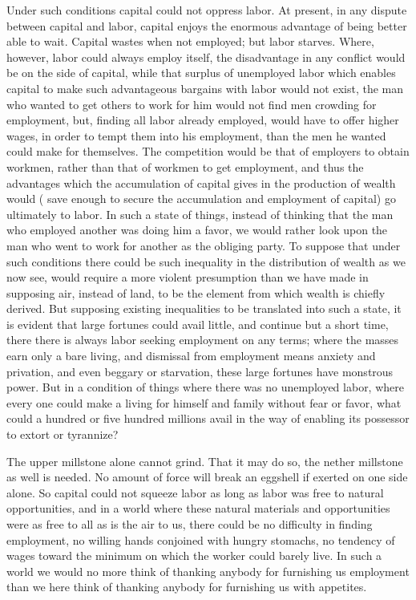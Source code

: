 \documentclass{book}
\begin{document}
Under such conditions capital could not oppress labor. At present, in any dispute between capital and labor, capital enjoys the enormous advantage of being better able to wait. Capital wastes when not employed; but labor starves. Where, however, labor could always employ itself, the disadvantage in any conflict would be on the side of capital, while that surplus of unemployed labor which enables capital to make such advantageous bargains with labor would not exist, the man who wanted to get others to work for him would not find men crowding for employment, but, finding all labor already employed, would have to offer higher wages, in order to tempt them into his employment, than the men he wanted could make for themselves. The competition would be that of employers to obtain workmen, rather than that of workmen to get employment, and thus the advantages which the accumulation of capital gives in the production of wealth would ( save enough to secure the accumulation and employment of capital) go ultimately to labor. In such a state of things, instead of thinking that the man who employed another was doing him a favor, we would rather look upon the man who went to work for another as the obliging party. To suppose that under such conditions there could be such inequality in the distribution of wealth as we now see, would require a more violent presumption than we have made in supposing air, instead of land, to be the element from which wealth is chiefly derived. But supposing existing inequalities to be translated into such a state, it is evident that large fortunes could avail little, and continue but a short time, there there is always labor seeking employment on any terms; where the masses earn only a bare living, and dismissal from employment means anxiety and privation, and even beggary or starvation, these large fortunes have monstrous power. But in a condition of things where there was no unemployed labor, where every one could make a living for himself and family without fear or favor, what could a hundred or five hundred millions avail in the way of enabling its possessor to extort or tyrannize?

The upper millstone alone cannot grind. That it may do so, the nether millstone as well is needed. No amount of force will break an eggshell if exerted on one side alone. So capital could not squeeze labor as long as labor was free to natural opportunities, and in a world where these natural materials and opportunities were as free to all as is the air to us, there could be no difficulty in finding employment, no willing hands conjoined with hungry stomachs, no tendency of wages toward the minimum on which the worker could barely live. In such a world we would no more think of thanking anybody for furnishing us employment than we here think of thanking anybody for furnishing us with appetites.
\end{document}
